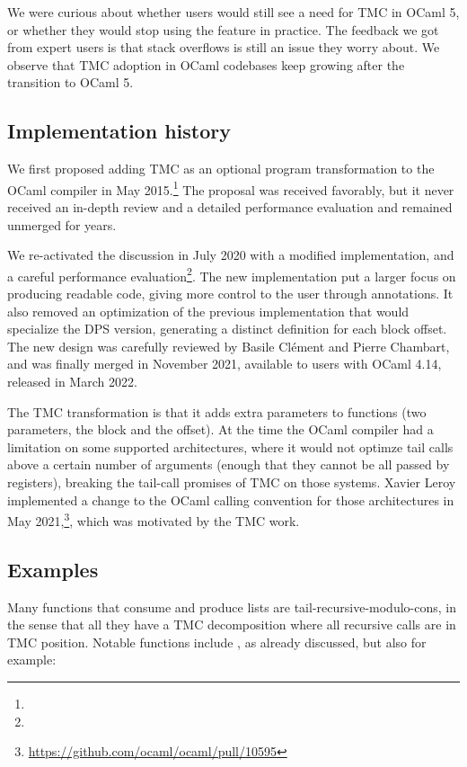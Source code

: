 We were curious about whether users would still see a need for TMC in OCaml 5, or whether they would stop using the feature in practice.
The feedback we got from expert users is that stack overflows is still an issue they worry about.
We observe that TMC adoption in OCaml codebases keep growing after the transition to OCaml 5.

\subsection{Implementation history}

We first proposed adding TMC as an optional program transformation to
the OCaml compiler in
May 2015.\footnote{}
The proposal was received favorably, but it never received an in-depth
review and a detailed performance evaluation and remained unmerged for
years.

We re-activated the discussion in July 2020 with a modified
implementation, and a careful performance
evaluation\footnote{}. The
new implementation put a larger focus on producing readable code,
giving more control to the user through annotations. It also removed
an optimization of the previous implementation that would specialize
the DPS version, generating a distinct definition for each block
offset. The new design was carefully reviewed by Basile Clément and
Pierre Chambart, and was finally merged in November 2021, available to
users with OCaml 4.14, released in March 2022.

The TMC transformation is that it adds extra parameters to functions
(two parameters, the block and the offset). At the time the OCaml
compiler had a limitation on some supported architectures, where it
would not optimze tail calls above a certain number of arguments
(enough that they cannot be all passed by registers), breaking the
tail-call promises of TMC on those systems. Xavier Leroy implemented
a change to the OCaml calling convention for those architectures in
May 2021,\footnote{\url{https://github.com/ocaml/ocaml/pull/10595}},
which was motivated by the TMC work.

\subsection{Examples}

Many functions that consume and produce lists are
tail-recursive-modulo-cons, in the sense that all they have a TMC
decomposition where all recursive calls are in TMC position. Notable
functions include , as already discussed, but also for
example:

